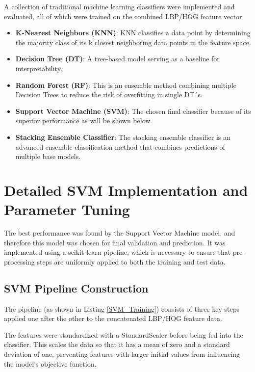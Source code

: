 A collection of traditional machine learning classifiers were implemented and evaluated, all of which were trained on the combined LBP/HOG feature vector.

\begin{itemize}
	\item \textbf{K-Nearest Neighbors (KNN)}: KNN classifies a data point by determining the majority class of its k closest neighboring data points in the feature space.
	\item \textbf{Decision Tree (DT)}: A tree-based model serving as a baseline for interpretability.
	\item \textbf{Random Forest (RF)}: This is an ensemble method combining multiple Decision Trees to reduce the risk of overfitting in single DT´s.
	\item \textbf{Support Vector Machine (SVM)}: The chosen final classifier because of its superior performance as will be shown below.
	\item \textbf{Stacking Ensemble Classifier}: The stacking ensemble classifier is an advanced ensemble classification method that combines predictions of multiple base models.
\end{itemize}


\section{Detailed SVM Implementation and Parameter Tuning}

The best performance was found by the Support Vector Machine model, and therefore this model was chosen for final validation and prediction. It was implemented using a scikit-learn pipeline, which is necessary to ensure that pre-processing steps are uniformly applied to both the training and test data.
\newline

\subsection{SVM Pipeline Construction}

The pipeline (as shown in Listing \ref{SVM_Training}) consists of three key steps applied one after the other to the concatenated LBP/HOG feature data.

The features were standardized with a StandardScaler before being fed into the classifier. This scales the data so that it has a mean of zero and a standard deviation of one, preventing features with larger initial values from influencing the model's objective function.

